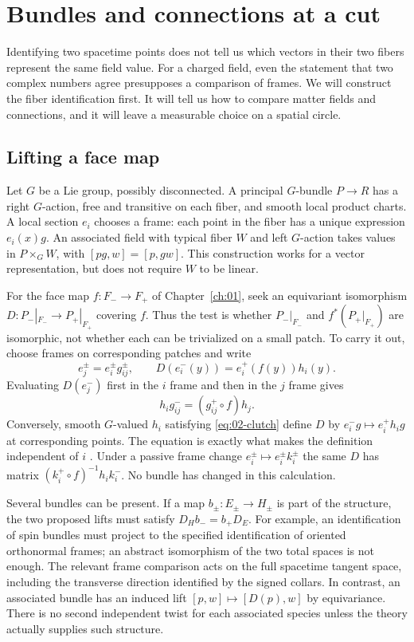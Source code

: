 \chapter{Bundles and connections at a cut}\label{ch:02}

Identifying two spacetime points does not tell us which vectors in their two fibers represent the same field value. For a charged field, even the statement that two complex numbers agree presupposes a comparison of frames. We will construct the fiber identification first. It will tell us how to compare matter fields and connections, and it will leave a measurable choice on a spatial circle.

\section{Lifting a face map}

Let $G$ be a Lie group, possibly disconnected. A principal $G$-bundle $P\to R$ has a right $G$-action, free and transitive on each fiber, and smooth local product charts. A local section $e_i$ chooses a frame: each point in the fiber has a unique expression $e_i(x)g$. An associated field with typical fiber $W$ and left $G$-action takes values in $P\times_G W$, with $[p g,w]=[p,g w]$. This construction works for a vector representation, but does not require $W$ to be linear.

For the face map $f:F_-\to F_+$ of Chapter~\ref{ch:01}, seek an equivariant isomorphism $D:P_-|_{F_-}\to P_+|_{F_+}$ covering $f$. Thus the test is whether $P_-|_{F_-}$ and $f^*(P_+|_{F_+})$ are isomorphic, not whether each can be trivialized on a small patch. To carry it out, choose frames on corresponding patches and write
\[
 e_j^\pm=e_i^\pm g_{ij}^\pm,\qquad
 D(e_i^-(y))=e_i^+(f(y))h_i(y).
\]
Evaluating $D(e_j^-)$ first in the $i$ frame and then in the $j$ frame gives
\begin{equation}
 h_i g_{ij}^-=(g_{ij}^+\circ f)h_j .\label{eq:02-clutch}
\end{equation}
Conversely, smooth $G$-valued $h_i$ satisfying \eqref{eq:02-clutch} define $D$ by $e_i^- g\mapsto e_i^+ h_i g$ at corresponding points. The equation is exactly what makes the definition independent of $i$ \cite{Steenrod}. Under a passive frame change $e_i^\pm\mapsto e_i^\pm k_i^\pm$ the same $D$ has matrix $(k_i^+\circ f)^{-1}h_i k_i^-$. No bundle has changed in this calculation.

Several bundles can be present. If a map $b_\pm:E_\pm\to H_\pm$ is part of the structure, the two proposed lifts must satisfy $D_H b_-=b_+D_E$. For example, an identification of spin bundles must project to the specified identification of oriented orthonormal frames; an abstract isomorphism of the two total spaces is not enough. The relevant frame comparison acts on the full spacetime tangent space, including the transverse direction identified by the signed collars. In contrast, an associated bundle has an induced lift $[p,w]\mapsto[D(p),w]$ by equivariance. There is no second independent twist for each associated species unless the theory actually supplies such structure.


